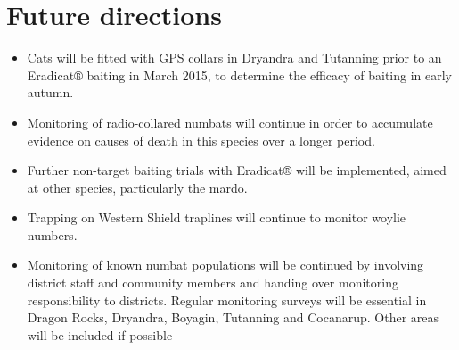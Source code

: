 \documentclass[version=last,
    paper=a4, %
    10pt, %
    usenames,
    dvipsnames,
    oneside, %
    headings=openany, %
    DIV=15 %
]{scrbook}
\begin{document}
\section*{Future directions}
\begin{itemize}
\itemsep1pt\parskip0pt
\item
  Cats will be fitted with GPS collars in Dryandra and Tutanning prior
  to an Eradicat® baiting in March 2015, to determine the efficacy of
  baiting in early autumn.
\item
  Monitoring of radio-collared numbats will continue in order to
  accumulate evidence on causes of death in this species over a longer
  period.
\item
  Further non-target baiting trials with Eradicat® will be implemented,
  aimed at other species, particularly the mardo.
\item
  Trapping on Western Shield traplines will continue to monitor woylie
  numbers.
\item
  Monitoring of known numbat populations will be continued by involving
  district staff and community members and handing over monitoring
  responsibility to districts. Regular monitoring surveys will be
  essential in Dragon Rocks, Dryandra, Boyagin, Tutanning and Cocanarup.
  Other areas will be included if possible
\end{itemize}



\end{document}
